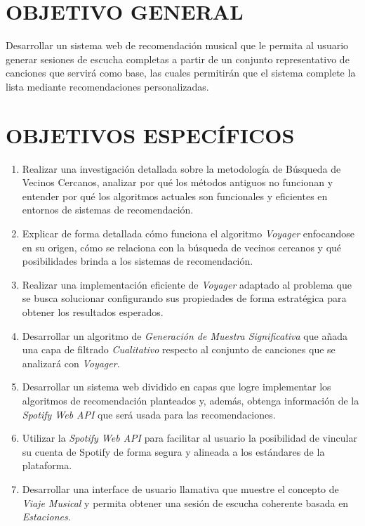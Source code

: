 \newpage
\thispagestyle{plain}
\vspace*{0.1cm}

\section{OBJETIVO GENERAL}
Desarrollar un sistema web de recomendación musical  que le permita al usuario generar sesiones de escucha completas a partir de un conjunto representativo de canciones que servirá como base, las cuales permitirán que el sistema complete la lista mediante recomendaciones personalizadas.

\section{OBJETIVOS ESPECÍFICOS}
\begin{enumerate}
    \item Realizar una investigación detallada sobre la metodología de Búsqueda de Vecinos Cercanos, analizar por qué los métodos antiguos no funcionan y entender por qué los algoritmos actuales son funcionales y eficientes en entornos de sistemas de recomendación.
    \item Explicar de forma detallada cómo funciona el algoritmo \textit{Voyager} enfocandose en su origen, cómo se relaciona con la búsqueda de vecinos cercanos y qué posibilidades brinda a los sistemas de recomendación.
    \item Realizar una implementación eficiente de \textit{Voyager} adaptado al problema que se busca solucionar configurando sus propiedades de forma estratégica para obtener los resultados esperados.
    \item Desarrollar un algoritmo de \textit{Generación de Muestra Significativa} que añada una capa de filtrado \textit{Cualitativo} respecto al conjunto de canciones que se analizará con \textit{Voyager}. 
    \item Desarrollar un sistema web dividido en capas que logre implementar los algoritmos de recomendación planteados y, además, obtenga información de la \textit{Spotify Web API} que será usada para las recomendaciones. 
    \item Utilizar la \textit{Spotify Web API} para facilitar al usuario la posibilidad de vincular su cuenta de Spotify de forma segura y alineada a los estándares de la plataforma.
    \item Desarrollar una interface de usuario llamativa que muestre el concepto de \textit{Viaje Musical} y permita obtener una sesión de escucha coherente basada en \textit{Estaciones}.

\end{enumerate}